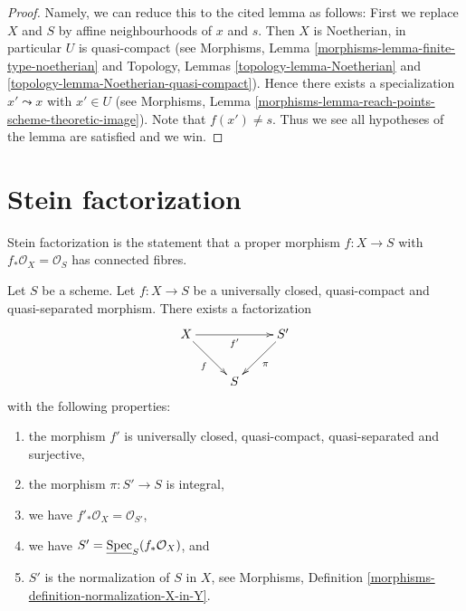 \begin{proof}
Namely, we can reduce this to the cited lemma as follows: First we
replace $X$ and $S$ by affine neighbourhoods of $x$ and $s$. Then $X$ is
Noetherian, in particular $U$ is quasi-compact (see
Morphisms, Lemma \ref{morphisms-lemma-finite-type-noetherian}
and
Topology, Lemmas \ref{topology-lemma-Noetherian} and
\ref{topology-lemma-Noetherian-quasi-compact}).
Hence there exists a specialization $x' \leadsto x$ with $x' \in U$ (see
Morphisms, Lemma \ref{morphisms-lemma-reach-points-scheme-theoretic-image}).
Note that $f(x') \not = s$. Thus we see all hypotheses of the lemma
are satisfied and we win.
\end{proof}



\section{Stein factorization}
\label{section-stein-factorization}

\noindent
Stein factorization is the statement that a proper morphism $f : X \to S$
with $f_*\mathcal{O}_X = \mathcal{O}_S$ has connected fibres.

\begin{lemma}
\label{lemma-stein-universally-closed}
Let $S$ be a scheme.
Let $f : X \to S$ be a universally closed, quasi-compact and
quasi-separated morphism.
There exists a factorization
$$
\xymatrix{
X \ar[rr]_{f'} \ar[rd]_f & & S' \ar[dl]^\pi \\
& S &
}
$$
with the following properties:
\begin{enumerate}
\item the morphism $f'$ is universally closed, quasi-compact, quasi-separated
and surjective,
\item the morphism $\pi : S' \to S$ is integral,
\item we have $f'_*\mathcal{O}_X = \mathcal{O}_{S'}$,
\item we have $S' = \underline{\mathop{\rm Spec}}_S(f_*\mathcal{O}_X)$, and
\item $S'$ is the normalization of $S$ in $X$, see
Morphisms, Definition \ref{morphisms-definition-normalization-X-in-Y}.
\end{enumerate}
\end{lemma}

